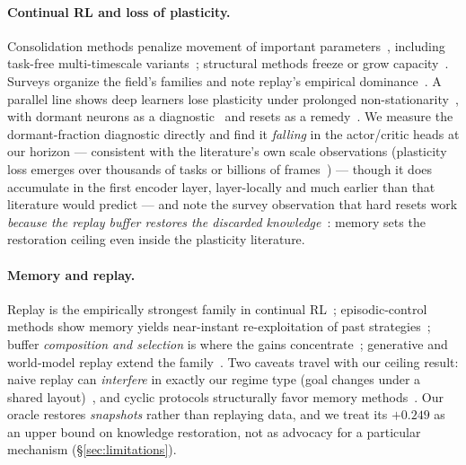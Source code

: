 \documentclass[11pt]{article}
\begin{document}
\paragraph{Continual RL and loss of plasticity.}
Consolidation methods penalize movement of important
parameters~\citep{kirkpatrick2017ewc,zenke2017si,schwarz2018progresscompress},
including task-free multi-timescale
variants~\citep{kaplanis2018complexsynapses,kaplanis2019policyconsolidation};
structural methods freeze or grow capacity~\citep{rusu2016prognet}. Surveys
organize the field's families and note replay's empirical
dominance~\citep{khetarpal2022continualrl,zuffer2025crlreview}. A parallel
line shows deep learners lose plasticity under prolonged
non-stationarity~\citep{dohare2024plasticity,abbas2023plasticity,lyle2022capacity,lyle2023plasticity,kumar2021implicit},
with dormant neurons as a diagnostic~\citep{sokar2023dormant} and resets as a
remedy~\citep{nikishin2022primacy,nikishin2023injection}. We measure the
dormant-fraction diagnostic directly and find it \emph{falling} in the
actor/critic heads at our horizon --- consistent with the literature's own
scale observations (plasticity loss emerges over thousands of tasks or
billions of frames~\citep{abbas2023plasticity,nikishin2023injection}) ---
though it does accumulate in the first encoder layer, layer-locally and
much earlier than that literature would predict --- and note the
survey observation that hard resets work \emph{because the replay buffer
restores the discarded knowledge}~\citep{klein2024plasticitysurvey}: memory
sets the restoration ceiling even inside the plasticity literature.

\paragraph{Memory and replay.}
Replay is the empirically strongest family in continual
RL~\citep{rolnick2019clear,powers2022cora}; episodic-control methods show
memory yields near-instant re-exploitation of past
strategies~\citep{blundell2016mfec,pritzel2017nec}; buffer \emph{composition
and selection} is where the gains concentrate~\citep{isele2018selectivereplay,kessler2023continualdreamer,yang2024wmar};
generative and world-model replay extend the
family~\citep{shin2017generativereplay,yue2024tdgr,pan2023lifelongwm}. Two
caveats travel with our ceiling result: naive replay can \emph{interfere} in
exactly our regime type (goal changes under a shared
layout)~\citep{kessler2023continualdreamer}, and cyclic protocols structurally
favor memory methods~\citep{powers2022cora}. Our oracle restores
\emph{snapshots} rather than replaying data, and we treat its $+0.249$ as an
upper bound on knowledge restoration, not as advocacy for a particular
mechanism (\S\ref{sec:limitations}).
\end{document}
